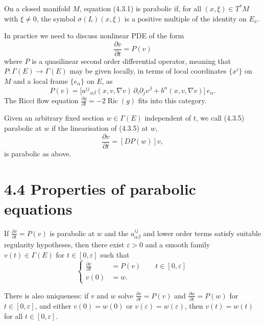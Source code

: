 \begin{remark}
\label{topping-pde-vector-parabolic-positive-multiple}
On a closed manifold $M$, equation (4.3.1) is parabolic if, for all
$(x,\xi)\in T^*M$ with $\xi\ne 0$, the symbol $\sigma(L)(x,\xi)$ is a positive
multiple of the identity on $E_x$.
\end{remark}

In practice we need to discuss nonlinear PDE of the form
\[
\frac{\partial v}{\partial t}=P(v)
\tag{4.3.5}
\]
where $P$ is a quasilinear second order differential operator, meaning that
$P:\Gamma(E)\to\Gamma(E)$ may be given locally, in terms of local coordinates
$\{x^i\}$ on $M$ and a local frame $\{e_\alpha\}$ on $E$, as
\[
P(v)=\bigl[a^{ij}{}_{\alpha\beta}(x,v,\nabla v)\,\partial_i\partial_j v^\beta
+b^\alpha(x,v,\nabla v)\bigr]\,e_\alpha.
\]
The Ricci flow equation $\frac{\partial g}{\partial t}=-2\operatorname{Ric}(g)$
fits into this category.

Given an arbitrary fixed section $w\in\Gamma(E)$ independent of $t$, we call
(4.3.5) parabolic at $w$ if the linearisation of (4.3.5) at $w$,
\[
\frac{\partial v}{\partial t}=[DP(w)]v,
\]
is parabolic as above.

\section*{4.4 \quad Properties of parabolic equations}

If $\frac{\partial v}{\partial t}=P(v)$ is parabolic at $w$ and the
$a_{\alpha\beta}^{ij}$ and lower order terms satisfy suitable regularity
hypotheses, then there exist $\varepsilon>0$ and a smooth family $v(t)\in
\Gamma(E)$ for $t\in[0,\varepsilon]$ such that
\[
\left\{
\begin{aligned}
\frac{\partial v}{\partial t} &= P(v) \qquad t\in[0,\varepsilon] \\
v(0) &= w.
\end{aligned}
\right.
\]

There is also uniqueness: if $v$ and $w$ solve $\frac{\partial v}{\partial t}
= P(v)$ and $\frac{\partial w}{\partial t}=P(w)$ for $t\in[0,\varepsilon]$,
and either $v(0)=w(0)$ or $v(\varepsilon)=w(\varepsilon)$, then
$v(t)=w(t)$ for all $t\in[0,\varepsilon]$.
